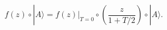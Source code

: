 \begin{equation} %
  f(z) \circ |A\rangle  = f(z)\Big|_{T=0}\circ \left(\frac{z}{1+T/2}\right)
\circ |A\rangle.
\end{equation} 
